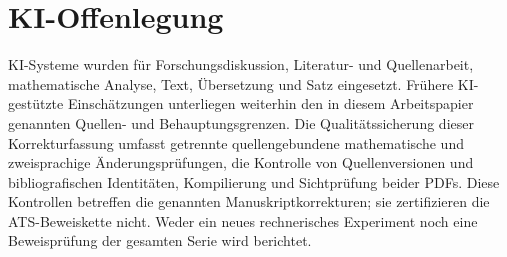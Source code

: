 \section*{KI-Offenlegung}
\noindent
KI-Systeme wurden für Forschungsdiskussion, Literatur- und Quellenarbeit,
mathematische Analyse, Text, Übersetzung und Satz eingesetzt. Frühere
KI-gestützte Einschätzungen unterliegen weiterhin den in diesem
Arbeitspapier genannten Quellen- und Behauptungsgrenzen.
\medskip
\noindent
Die Qualitätssicherung dieser Korrekturfassung umfasst getrennte
quellengebundene mathematische und zweisprachige Änderungsprüfungen,
die Kontrolle von Quellenversionen und bibliografischen Identitäten,
Kompilierung und Sichtprüfung beider PDFs. Diese Kontrollen betreffen
die genannten Manuskriptkorrekturen; sie zertifizieren die
ATS-Beweiskette nicht. Weder ein neues rechnerisches Experiment
noch eine Beweisprüfung der gesamten Serie wird berichtet.
